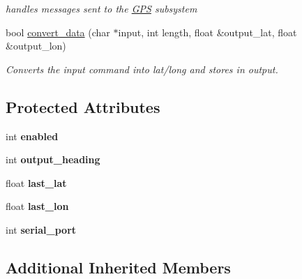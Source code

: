 \begin{DoxyCompactItemize}
\begin{DoxyCompactList}\small\item\em handles messages sent to the \hyperlink{classGPS}{G\-P\-S} subsystem \end{DoxyCompactList}\item 
\hypertarget{classGPS_a41dc6041167ef4e2860274629392c300}{bool \hyperlink{classGPS_a41dc6041167ef4e2860274629392c300}{convert\-\_\-data} (char $\ast$input, int length, float \&output\-\_\-lat, float \&output\-\_\-lon)}\label{classGPS_a41dc6041167ef4e2860274629392c300}

\begin{DoxyCompactList}\small\item\em Converts the input command into lat/long and stores in output. \end{DoxyCompactList}\end{DoxyCompactItemize}
\subsection*{Protected Attributes}
\begin{DoxyCompactItemize}
\item 
\hypertarget{classGPS_a8e7d8703e1974afe9819e29da13350c1}{int {\bfseries enabled}}\label{classGPS_a8e7d8703e1974afe9819e29da13350c1}

\item 
\hypertarget{classGPS_a14c36e0dcc27dfa5e1381b9a4b25c2ce}{int {\bfseries output\-\_\-heading}}\label{classGPS_a14c36e0dcc27dfa5e1381b9a4b25c2ce}

\item 
\hypertarget{classGPS_a2a3644aa4c6f60c59905b3050e4dc935}{float {\bfseries last\-\_\-lat}}\label{classGPS_a2a3644aa4c6f60c59905b3050e4dc935}

\item 
\hypertarget{classGPS_a5be7ea29b18ea3f78cbe0323a63bc3f4}{float {\bfseries last\-\_\-lon}}\label{classGPS_a5be7ea29b18ea3f78cbe0323a63bc3f4}

\item 
\hypertarget{classGPS_a62ebacee895a13c211bfd372b818b680}{int {\bfseries serial\-\_\-port}}\label{classGPS_a62ebacee895a13c211bfd372b818b680}

\end{DoxyCompactItemize}
\subsection*{Additional Inherited Members}


